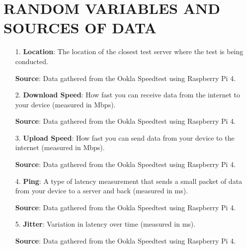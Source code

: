 \documentclass[conference]{IEEEtran}
\begin{document}
\section{RANDOM VARIABLES AND SOURCES OF DATA}
\begin{enumerate}
    \item[1.]
    \textbf{Location}:
    The location of the closest test server where the test is being conducted.

    \textbf{Source}: Data gathered from the Ookla Speedtest using Raspberry Pi 4. 
    \item[2.]    
    \textbf{Download Speed}: 
    How fast you can receive data from the internet to your device (measured in Mbps).

    \textbf{Source}: Data gathered from the Ookla Speedtest using Raspberry Pi 4. 
    \item[3.]
    \textbf{Upload Speed}:
    How fast you can send data from your device to the internet (measured in Mbps). 
    
    \textbf{Source}: Data gathered from the Ookla Speedtest using Raspberry Pi 4. 
    \item[4.]
    \textbf{Ping}: 
    A type of latency measurement that sends a small packet of data from your device to a server and back (measured in ms).

    \textbf{Source}: Data gathered from the Ookla Speedtest using Raspberry Pi 4. 
    \item[5.] 
    \textbf{Jitter}: 
    Variation in latency over time (measured in ms).

    \textbf{Source}: Data gathered from the Ookla Speedtest using Raspberry Pi 4. 
\end{enumerate}
\end{document}
